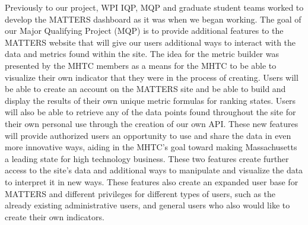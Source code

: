 Previously to our project, WPI IQP, MQP and graduate student teams worked to develop the MATTERS dashboard as it was when we began working. The goal of our Major Qualifying Project (MQP) is to provide additional features to the MATTERS website that will give our users additional ways to interact with the data and metrics found within the site. The idea for the metric builder was presented by the MHTC members as a means for the MHTC to be able to visualize their own indicator that they were in the process of creating. Users will be able to create an account on the MATTERS site and be able to build and display the results of their own unique metric formulas for ranking states. Users will also be able to retrieve any of the data points found throughout the site for their own personal use through the creation of our own API. These new features will provide authorized users an opportunity to use and share the data in even more innovative ways, aiding in the MHTC’s goal toward making Massachusetts a leading state for high technology business. These two features create further access to the site’s data and additional ways to manipulate and visualize the data to interpret it in new ways. These features also create an expanded user base for MATTERS and different privileges for different types of users, such as the already existing administrative users, and general users who also would like to create their own indicators.